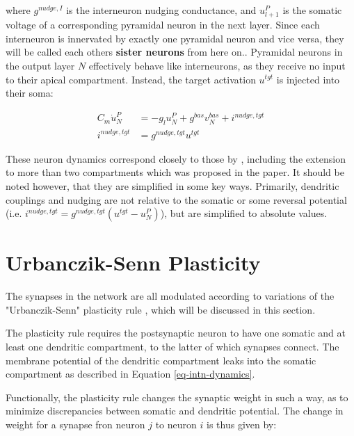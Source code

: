 where $ g^{nudge, I}$ is the interneuron nudging conductance, and $u_{l+1}^P$ is the somatic voltage of a corresponding
pyramidal neuron in the next layer. Since each interneuron is innervated by exactly one pyramidal neuron and vice versa,
they will be called each others \textbf{sister neurons} from here on.. Pyramidal neurons in the output layer $N$ effectively behave like interneurons, as they receive no input
to their apical compartment. Instead, the target  activation $u^{tgt}$ is injected into their soma:

\begin{align}
  C_m \dot{u}_N^P & = - g_l u_N^{P} + g^{bas} v_N^{bas} + i^{nudge, tgt} \\
  i^{nudge, tgt}  & = g^{nudge, tgt} u^{tgt}
\end{align}


These neuron dynamics correspond closely to those by \cite{urbanczik2014learning}, including the extension to more than
two compartments which was proposed in the paper. It should be noted however, that they are simplified in some key ways.
Primarily, dendritic couplings and nudging are not relative to the somatic or some reversal potential (i.e. $i^{nudge,
      tgt}= g^{nudge, tgt} (u^{tgt} - u_N^P )$), but are simplified to absolute values. 








\section{Urbanczik-Senn Plasticity}\label{sec-urb-senn-plast}

The synapses in the network are all modulated according to variations of the "Urbanczik-Senn" plasticity rule
\citep{urbanczik2014learning}, which will be discussed in this section. 

The plasticity rule requires the postsynaptic neuron to have one somatic and at least one dendritic compartment, to the
latter of which synapses connect. The membrane potential of the dendritic compartment leaks into the somatic compartment
as described in Equation \ref{eq-intn-dynamics}.


Functionally, the plasticity rule changes the synaptic weight in such a way, as to minimize discrepancies between
somatic and dendritic potential. The change in weight for a synapse fron neuron $j$ to neuron $i$ is thus given by:

